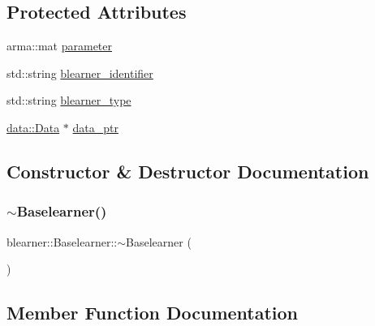 \subsection*{Protected Attributes}
\begin{DoxyCompactItemize}
\item 
arma\+::mat \hyperlink{classblearner_1_1_baselearner_a56e401f574b274d65e364493277f3247}{parameter}
\item 
std\+::string \hyperlink{classblearner_1_1_baselearner_a7112e057b2b29bb6529df6df3b8a9165}{blearner\+\_\+identifier}
\item 
std\+::string \hyperlink{classblearner_1_1_baselearner_aed6406144af33850b3cb9222dddf3f57}{blearner\+\_\+type}
\item 
\hyperlink{classdata_1_1_data}{data\+::\+Data} $\ast$ \hyperlink{classblearner_1_1_baselearner_a5b5cfab411ff94a13bcce4ca0dd4e507}{data\+\_\+ptr}
\end{DoxyCompactItemize}


\subsection{Constructor \& Destructor Documentation}
\mbox{\label{classblearner_1_1_baselearner_a1ada1c47d71e60bec80ab033ffa40813}} 
\subsubsection{\texorpdfstring{$\sim$\+Baselearner()}{~Baselearner()}}
{\footnotesize\ttfamily blearner\+::\+Baselearner\+::$\sim$\+Baselearner (\begin{DoxyParamCaption}{ }\end{DoxyParamCaption})\hspace{0.3cm}{\ttfamily [virtual]}}



\subsection{Member Function Documentation}
\mbox{\label{classblearner_1_1_baselearner_a8e12c6739f085917a7d2da6570c51a21}} 
